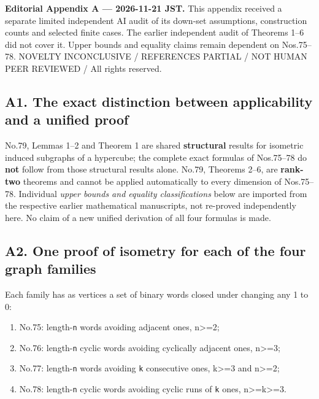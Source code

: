 \documentclass[
]{article}
\providecommand{\tightlist}{%
  \setlength{\itemsep}{0pt}\setlength{\parskip}{0pt}}
\begin{document}
\textbf{Editorial Appendix A --- 2026-11-21 JST.} This appendix received
a separate limited independent AI audit of its down-set assumptions,
construction counts and selected finite cases. The earlier independent
audit of Theorems 1--6 did not cover it. Upper bounds and equality
claims remain dependent on Nos.75--78. NOVELTY INCONCLUSIVE / REFERENCES
PARTIAL / NOT HUMAN PEER REVIEWED / All rights reserved.

\subsection{A1. The exact distinction between applicability and a
unified
proof}\label{a1.-the-exact-distinction-between-applicability-and-a-unified-proof}

No.79, Lemmas 1--2 and Theorem 1 are shared \textbf{structural} results
for isometric induced subgraphs of a hypercube; the complete exact
formulas of Nos.75--78 do \textbf{not} follow from those structural
results alone. No.79, Theorems 2--6, are \textbf{rank-two} theorems and
cannot be applied automatically to every dimension of Nos.75--78.
Individual \emph{upper bounds and equality classifications} below are
imported from the respective earlier mathematical manuscripts, not
re-proved independently here. No claim of a new unified derivation of
all four formulas is made.

\subsection{A2. One proof of isometry for each of the four graph
families}\label{a2.-one-proof-of-isometry-for-each-of-the-four-graph-families}

Each family has as vertices a set of binary words closed under changing
any 1 to 0:

\begin{enumerate}
\def\labelenumi{\arabic{enumi}.}
\tightlist
\item
  No.75: length-\texttt{n} words avoiding adjacent ones,
  n\textgreater=2;
\item
  No.76: length-\texttt{n} cyclic words avoiding cyclically adjacent
  ones, n\textgreater=3;
\item
  No.77: length-\texttt{n} words avoiding \texttt{k} consecutive ones,
  k\textgreater=3 and n\textgreater=2;
\item
  No.78: length-\texttt{n} cyclic words avoiding cyclic runs of
  \texttt{k} ones, n\textgreater=k\textgreater=3.
\end{enumerate}
\end{document}
